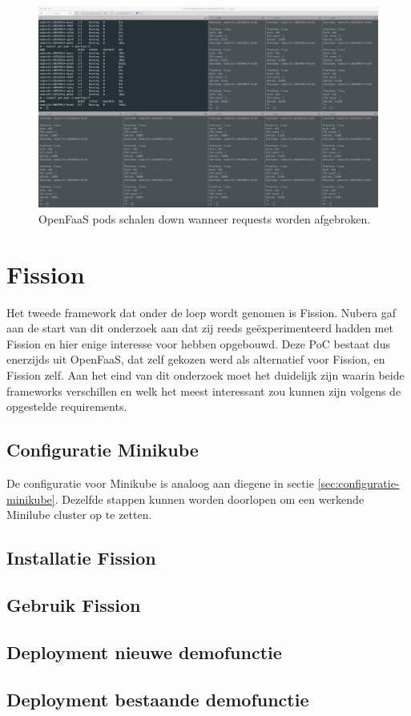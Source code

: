 \begin{figure}
    \includegraphics[width=1\textwidth]{img/openfaas-scalability-3.png}
    \caption{OpenFaaS pods schalen down wanneer requests worden afgebroken.}
    \label{fig:openfaas-scalability-3}  
\end{figure}

\section{Fission}
Het tweede framework dat onder de loep wordt genomen is Fission. Nubera gaf aan de start van dit onderzoek aan dat zij reeds geëxperimenteerd hadden met Fission en hier enige interesse voor hebben opgebouwd. Deze PoC bestaat dus enerzijds uit OpenFaaS, dat zelf gekozen werd als alternatief voor Fission, en Fission zelf. Aan het eind van dit onderzoek moet het duidelijk zijn waarin beide frameworks verschillen en welk het meest interessant zou kunnen zijn volgens de opgestelde requirements.

\subsection{Configuratie Minikube}
De configuratie voor Minikube is analoog aan diegene in sectie \ref{sec:configuratie-minikube}. Dezelfde stappen kunnen worden doorlopen om een werkende Minilube cluster op te zetten.

\subsection{Installatie Fission}
\subsection{Gebruik Fission}
\subsection{Deployment nieuwe demofunctie}
\subsection{Deployment bestaande demofunctie}